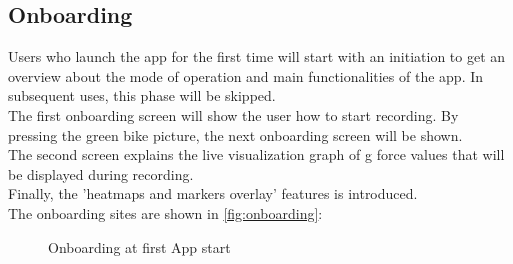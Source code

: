 \documentclass[10pt,a4paper]{article} %
\begin{document}
    \subsection{Onboarding}
    	Users who launch the app for the first time will start with an initiation to get an overview about the mode of operation and main functionalities of the app. In subsequent uses, this phase will be skipped.\\
    	The first onboarding screen will show the user how to start recording. By pressing the green bike picture, the next onboarding screen will be shown. \\
    	The second screen explains the live visualization graph of g force values that will be displayed during recording.\\
    	Finally, the 'heatmaps and markers overlay' features is introduced.\\
	The onboarding sites are shown in \autoref{fig:onboarding}:
    

	\begin{figure}[H]
	  \centering
	  \hfill
	  \hfill
	  \caption{Onboarding at first App start}
	  \label{fig:onboarding}
	\end{figure}
	
\end{document}
